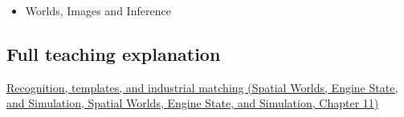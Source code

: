 \begin{itemize}
\tightlist
\item
  {Worlds, Images and Inference}
\end{itemize}

\subsection{Full teaching explanation}\label{appendix-5fb4af80d1c7-full-teaching-explanation}

\href{../05-Spatial-Worlds-Engine-State-and-Simulation/main.pdf\#nameddest=04-visual-computing-ii-ch030-recognition-templates-and-industrial-matching}{Recognition, templates, and industrial matching (Spatial Worlds, Engine State, and Simulation, Spatial Worlds, Engine State, and Simulation, Chapter 11)}
